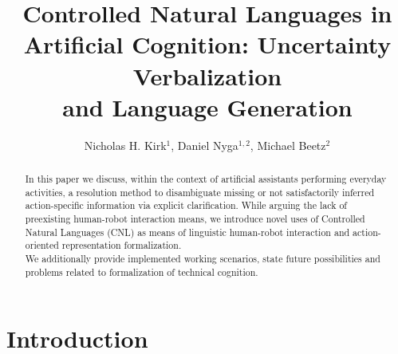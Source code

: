 \documentclass[oribibl]{llncs}
\begin{document}
%
\frontmatter          %
%
\pagestyle{headings}  %
\title{Controlled Natural Languages in\\ Artificial Cognition: Uncertainty Verbalization\\and Language Generation}
%
\author{Nicholas H. Kirk$^1$, Daniel Nyga$^{1,2}$, Michael Beetz$^2$}
%
%
%
\maketitle              %
\begin{abstract}

In this paper we discuss, within the context of artificial assistants performing everyday activities, a resolution method to disambiguate missing or not satisfactorily inferred action-specific information via explicit clarification.
While arguing the lack of preexisting human-robot interaction means, 
we introduce novel uses of Controlled Natural Languages (CNL)
as means of linguistic human-robot interaction and action-oriented representation formalization.\\
We additionally provide implemented working scenarios, 
state future possibilities and problems related to formalization of technical cognition.

 \end{abstract}

\section{Introduction} 
\end{document}
